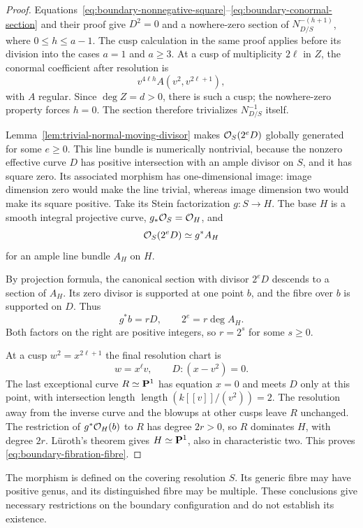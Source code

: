 \begin{proof}
Equations~\eqref{eq:boundary-nonnegative-square}--\eqref{eq:boundary-conormal-section}
and their proof give $D^2=0$ and a nowhere-zero section
of $N_{D/S}^{-(h+1)}$, where $0\leq h\leq a-1$.
The cusp calculation in the same proof applies before its division
into the cases $a=1$ and $a\geq3$.  At a cusp of multiplicity
$2\ell$ in $Z$, the conormal coefficient after resolution is
\[
 v^{4\ell h}A(v^2,v^{2\ell+1}),
\]
with $A$ regular.  Since $\deg Z=d>0$, there is such a cusp;
the nowhere-zero property forces $h=0$.  The section therefore
trivializes $N_{D/S}^{-1}$ itself.

Lemma~\ref{lem:trivial-normal-moving-divisor} makes
$\mathcal O_S(2^eD)$ globally generated for some $e\geq0$.
This line bundle is numerically nontrivial, because the nonzero
effective curve $D$ has positive intersection with an ample divisor
on $S$, and it has square zero.  Its associated morphism has
one-dimensional image: image dimension zero would make the line
trivial, whereas image dimension two would make its square positive.
Take its Stein factorization $g:S\to H$.  The base $H$ is a smooth
integral projective curve, $g_*\mathcal O_S=\mathcal O_H$, and
\[
 \mathcal O_S(2^eD)\simeq g^*A_H
\]
for an ample line bundle $A_H$ on $H$.

By projection formula, the canonical section with divisor $2^eD$
descends to a section of $A_H$.  Its zero divisor is supported at one
point $b$, and the fibre over $b$ is supported on $D$.  Thus
\[
 g^*b=rD,\qquad 2^e=r\deg A_H.
\]
Both factors on the right are positive integers, so $r=2^s$ for some
$s\geq0$.

At a cusp $w^2=x^{2\ell+1}$ the final resolution chart is
\[
 w=x^\ell v,\qquad D:(x-v^2)=0.
\]
The last exceptional curve $R\simeq\mathbf P^1$ has equation $x=0$ and
meets $D$ only at this point, with intersection length
$\operatorname{length}(k[[v]]/(v^2))=2$.
The resolution away from the inverse curve and the blowups at other
cusps leave $R$ unchanged.  The restriction of $g^*\mathcal O_H(b)$ to $R$
has degree $2r>0$, so $R$ dominates $H$, with degree $2r$.
L\"uroth's theorem gives $H\simeq\mathbf P^1$, also in characteristic two.
This proves \eqref{eq:boundary-fibration-fibre}.
\end{proof}

The morphism is defined on the covering resolution $S$.  Its generic
fibre may have positive genus, and its distinguished fibre may be
multiple.  These conclusions give necessary restrictions on the
boundary configuration and do not establish its existence.
